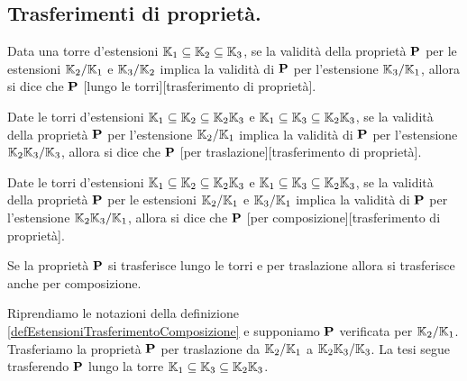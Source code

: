 \subsection{Trasferimenti di propriet\`a.}\label{TrasferimentiDiProprieta}
\begin{Definition}\label{defEstensioniTrasferimentoTorre}
	Data una torre d'estensioni $\mathbb{K}_1 \subseteq \mathbb{K}_2 \subseteq \mathbb{K}_3$, se la validit\`a della propriet\`a $\mathbf{P}$ per le estensioni $\mathbb{K}_2/\mathbb{K}_1$ e $\mathbb{K}_3/\mathbb{K}_2$ implica la validit\`a di $\mathbf{P}$ per l'estensione $\mathbb{K}_3/\mathbb{K}_1$, allora si dice che $\mathbf{P}$ [lungo le torri][trasferimento di propriet\`a].
\end{Definition}
\begin{Definition}\label{defEstensioniTrasferimentoTraslazione}
	Date le torri d'estensioni $\mathbb{K}_1 \subseteq \mathbb{K}_2 \subseteq \mathbb{K}_2\mathbb{K}_3$ e $\mathbb{K}_1 \subseteq \mathbb{K}_3 \subseteq \mathbb{K}_2\mathbb{K}_3$, se la validit\`a della propriet\`a $\mathbf{P}$ per l'estensione $\mathbb{K}_2/\mathbb{K}_1$ implica la validit\`a di $\mathbf{P}$ per l'estensione $\mathbb{K}_2\mathbb{K}_3/\mathbb{K}_3$, allora si dice che $\mathbf{P}$ [per traslazione][trasferimento di propriet\`a].
\end{Definition}
\begin{Definition}\label{defEstensioniTrasferimentoComposizione}
	Date le torri d'estensioni $\mathbb{K}_1 \subseteq \mathbb{K}_2 \subseteq \mathbb{K}_2\mathbb{K}_3$ e $\mathbb{K}_1 \subseteq \mathbb{K}_3 \subseteq \mathbb{K}_2\mathbb{K}_3$, se la validit\`a della propriet\`a $\mathbf{P}$ per le estensioni $\mathbb{K}_2/\mathbb{K}_1$ e $\mathbb{K}_3/\mathbb{K}_1$ implica la validit\`a di $\mathbf{P}$ per l'estensione $\mathbb{K}_2\mathbb{K}_3/\mathbb{K}_1$, allora si dice che $\mathbf{P}$ [per composizione][trasferimento di propriet\`a].
\end{Definition}
\begin{Theorem}
	Se la propriet\`a $\mathbf{P}$  si trasferisce lungo le torri e per traslazione allora si trasferisce anche per composizione.
\end{Theorem}
\Proof Riprendiamo le notazioni della definizione \ref{defEstensioniTrasferimentoComposizione} e supponiamo $\mathbf{P}$ verificata per $\mathbb{K}_2/\mathbb{K}_1$. Trasferiamo la propriet\`a $\mathbf{P}$ per traslazione da $\mathbb{K}_2/\mathbb{K}_1$ a $\mathbb{K}_2\mathbb{K}_3/\mathbb{K}_3$. La tesi segue trasferendo $\mathbf{P}$ lungo la torre $\mathbb{K}_1 \subseteq \mathbb{K}_3 \subseteq \mathbb{K}_2\mathbb{K}_3$. \EndProof
